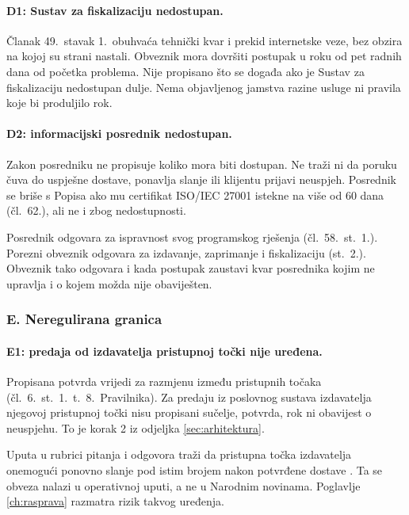 \paragraph{D1: Sustav za fiskalizaciju nedostupan.}
Članak 49.\ stavak 1.\ obuhvaća tehnički kvar i prekid internetske veze, bez
obzira na kojoj su strani nastali. Obveznik mora dovršiti postupak u roku od
pet radnih dana od početka problema. Nije propisano što se događa ako je
Sustav za fiskalizaciju nedostupan dulje. Nema objavljenog jamstva razine
usluge ni pravila koje bi produljilo rok.

\paragraph{D2: informacijski posrednik nedostupan.}
Zakon posredniku ne propisuje koliko mora biti dostupan. Ne traži ni da
poruku čuva do uspješne dostave, ponavlja slanje ili klijentu prijavi
neuspjeh. Posrednik se briše s Popisa ako mu certifikat ISO/IEC 27001
istekne na više od 60 dana (čl.~62.), ali ne i zbog nedostupnosti.

Posrednik odgovara za ispravnost svog programskog rješenja
(čl.~58.~st.~1.). Porezni obveznik odgovara za izdavanje, zaprimanje i
fiskalizaciju (st.~2.). Obveznik tako odgovara i kada postupak zaustavi kvar
posrednika kojim ne upravlja i o kojem možda nije obaviješten.

\subsubsection*{E. Neregulirana granica}

\paragraph{E1: predaja od izdavatelja pristupnoj točki nije uređena.}
Propisana potvrda vrijedi za razmjenu između pristupnih točaka
(čl.~6.~st.~1.~t.~8.\ Pravilnika). Za predaju iz poslovnog sustava
izdavatelja njegovoj pristupnoj točki nisu propisani sučelje, potvrda, rok
ni obavijest o neuspjehu. To je korak 2 iz odjeljka
\ref{sec:arhitektura}.

Uputa u rubrici pitanja i odgovora traži da pristupna točka izdavatelja
onemogući ponovno slanje pod istim brojem nakon potvrđene dostave
\cite{pu2026pitanjaodgovori}. Ta se obveza nalazi u operativnoj uputi, a ne
u Narodnim novinama. Poglavlje \ref{ch:rasprava} razmatra rizik takvog
uređenja.

